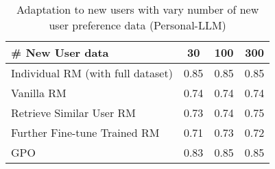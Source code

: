 \begin{table*}[ht!]
\centering
\label{tab:sample_efficiency_ablation_single}
\small
\begin{tabular}{l|ccc}
\toprule
\textbf{\# New User data}                     & \textbf{30} & \textbf{100} & \textbf{300}\\ 
\midrule
Individual RM (with full dataset)   &   0.85     &    0.85   &  0.85 \\  
\midrule
Vanilla RM                          &    0.74    &     0.74   &  0.74 \\ 
Retrieve Similar User RM            &    0.73         & 0.74     &  0.75   \\ 
Further Fine-tune Trained RM             &      0.71           &   0.73        &     0.72      \\
GPO                                 &      0.83       &    0.85 &  0.85       \\ 
\bottomrule
\end{tabular}
\caption{Adaptation to new users with vary number of new user preference data (Personal-LLM)}
\label{table: adaptation_results}
\end{table*}

